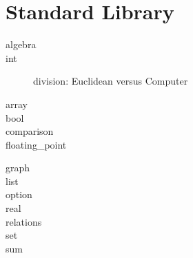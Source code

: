 \chapter{Standard Library}
\label{chap:library}

\begin{description}

\item[algebra]

\item[int]

division: Euclidean versus Computer


\item[array]

\item[bool]

\item[comparison]

\item[floating\_point]

\cite{ayad10ijcar}

\item[graph]

\item[list]

\item[option]

\item[real]

\item[relations]

\item[set]

\item[sum]

\end{description}




